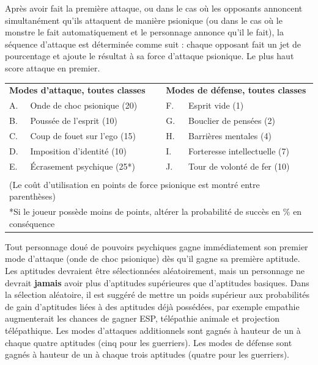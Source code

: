 \documentclass[11pt]{article}
\begin{document}
{\medskip

Après avoir fait la première attaque, ou dans le cas où les opposants annoncent simultanément qu'ils attaquent de manière psionique (ou dans le cas où le monstre le fait automatiquement et le personnage annonce qu'il le fait), la séquence d'attaque est déterminée comme suit : chaque opposant fait un jet de pourcentage et ajoute le résultat à sa force d'attaque psionique. Le plus haut score attaque en premier.

\bigskip

{\parindent0.5cm
\begin{tabular}{llcll}
\multicolumn{2}{l}{\textbf{Modes d'attaque, toutes classes}} && \multicolumn{2}{l}{\textbf{Modes de défense, toutes classes}} \\
A. & Onde de choc psionique (20)  && F. & Esprit vide (1) \\
B. & Poussée de l'esprit (10) 	  && G. & Bouclier de pensées (2) \\
C. & Coup de fouet sur l'ego (15) && H. & Barrières mentales (4) \\
D. & Imposition d'identité (10)   && I. & Forteresse intellectuelle (7) \\
E. & Écrasement psychique (25*)   && J. & Tour de volonté de fer (10) \\
&&&& \\
\multicolumn{5}{p{15cm}}{(Le coût d'utilisation en points de force psionique est montré entre parenthèses)} \\
\multicolumn{5}{p{15cm}}{*Si le joueur possède moins de points, altérer la probabilité de succès en \% en conséquence} \\
\end{tabular}}

\medskip

Tout personnage doué de pouvoirs psychiques gagne immédiatement son premier mode d'attaque (onde de choc psionique) dès qu'il gagne sa première aptitude. Les aptitudes devraient être sélectionnées aléatoirement, mais un personnage ne devrait \textbf{jamais} avoir plus d'aptitudes supérieures que d'aptitudes basiques. Dans la sélection aléatoire, il est suggéré de mettre un poids supérieur aux probabilités de gain d'aptitudes liées à des aptitudes déjà possédées, par exemple empathie augmenterait les chances de gagner ESP, télépathie animale et projection télépathique. Les modes d'attaques additionnels sont gagnés à hauteur de un à chaque quatre aptitudes (cinq pour les guerriers). Les modes de défense sont gagnés à hauteur de un à chaque trois aptitudes (quatre pour les guerriers).

}
\end{document}
